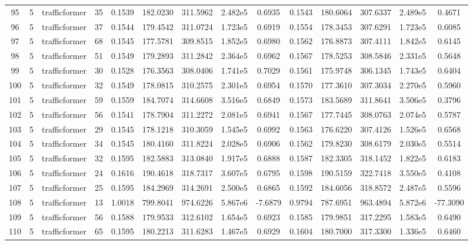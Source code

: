 \begin{landscape}
\begin{longtable}{c c c c c c c c c c c c c c}
	95 & 5 & trafficformer & 35 & 0.1539 & 182.0230 & 311.5962 & 2.482e5 & 0.6935 & 0.1543 & 180.6064 & 307.6337 & 2.489e5 & 0.4671 \\
	96 & 5 & trafficformer & 37 & 0.1544 & 179.4542 & 311.0724 & 1.723e5 & 0.6919 & 0.1554 & 178.3453 & 307.6291 & 1.723e5 & 0.6085 \\
	97 & 5 & trafficformer & 68 & 0.1545 & 177.5781 & 309.8515 & 1.852e5 & 0.6980 & 0.1562 & 176.8873 & 307.4111 & 1.842e5 & 0.6145 \\
	98 & 5 & trafficformer & 51 & 0.1549 & 179.2893 & 311.2842 & 2.364e5 & 0.6962 & 0.1567 & 178.5253 & 308.5846 & 2.331e5 & 0.5648 \\
	99 & 5 & trafficformer & 30 & 0.1528 & 176.3563 & 308.0406 & 1.741e5 & 0.7029 & 0.1561 & 175.9748 & 306.1345 & 1.743e5 & 0.6404 \\
	100 & 5 & trafficformer & 32 & 0.1549 & 178.0815 & 310.2575 & 2.301e5 & 0.6954 & 0.1570 & 177.3610 & 307.3034 & 2.270e5 & 0.5960 \\
	101 & 5 & trafficformer & 59 & 0.1559 & 184.7074 & 314.6608 & 3.516e5 & 0.6849 & 0.1573 & 183.5689 & 311.8641 & 3.506e5 & 0.3796 \\
	102 & 5 & trafficformer & 56 & 0.1541 & 178.7904 & 311.2272 & 2.081e5 & 0.6941 & 0.1567 & 177.7445 & 308.0763 & 2.074e5 & 0.5787 \\
	103 & 5 & trafficformer & 29 & 0.1545 & 178.1218 & 310.3059 & 1.545e5 & 0.6992 & 0.1563 & 176.6220 & 307.4126 & 1.526e5 & 0.6568 \\
	104 & 5 & trafficformer & 34 & 0.1545 & 180.4160 & 311.8224 & 2.028e5 & 0.6906 & 0.1562 & 179.8230 & 308.6179 & 2.030e5 & 0.5514 \\
	105 & 5 & trafficformer & 32 & 0.1595 & 182.5883 & 313.0840 & 1.917e5 & 0.6888 & 0.1587 & 182.3305 & 318.1452 & 1.822e5 & 0.6183 \\
	106 & 5 & trafficformer & 24 & 0.1616 & 190.4618 & 318.7317 & 3.607e5 & 0.6795 & 0.1598 & 190.5159 & 322.7418 & 3.550e5 & 0.4108 \\
	107 & 5 & trafficformer & 25 & 0.1595 & 184.2969 & 314.2691 & 2.500e5 & 0.6865 & 0.1592 & 184.6056 & 318.8572 & 2.487e5 & 0.5596 \\
	108 & 5 & trafficformer & 13 & 1.0018 & 799.8041 & 974.6226 & 5.867e6 & -7.6879 & 0.9794 & 787.6951 & 963.4894 & 5.872e6 & -77.3090 \\
	109 & 5 & trafficformer & 56 & 0.1588 & 179.9533 & 312.6102 & 1.654e5 & 0.6923 & 0.1585 & 179.9851 & 317.2295 & 1.583e5 & 0.6490 \\
	110 & 5 & trafficformer & 65 & 0.1595 & 180.2213 & 311.6283 & 1.467e5 & 0.6929 & 0.1604 & 180.7000 & 317.3300 & 1.336e5 & 0.6460 \\

\end{longtable}
\end{landscape}
